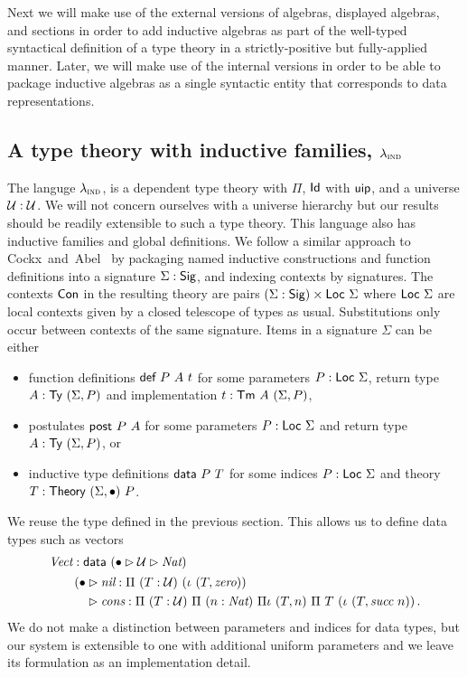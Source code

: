 Next we will make use of the external versions of algebras, displayed algebras,
and sections in order to add inductive algebras as part of the well-typed
syntactical definition of a type theory in a strictly-positive but fully-applied
manner. Later, we will make use of the internal versions in order to be able to
package inductive algebras as a single syntactic entity that corresponds to data
representations.

\subsection{A type theory with inductive families, $\lambda_{\textsc{ind}}$}\label{sub:lambdaind}

The languge $\lambda_{\textsc{ind}}$, is a dependent type theory with $\Pi$, $\textsf{Id}$ with
$\textsf{uip}$, and a universe $\mathcal{U} : \mathcal{U}$. We will not concern ourselves with a
universe hierarchy but our results should be readily extensible to such a type
theory. This language also has inductive families and global definitions. We
follow a similar approach
to Cockx~and~Abel~\cite{Cockx2018-fk} by packaging named inductive constructions
and function definitions into a signature $\Sigma : \textsf{Sig}$, and indexing contexts
by signatures. The contexts $\textsf{Con}$ in the resulting theory are pairs $(\Sigma :
\textsf{Sig}) \times \textsf{Loc}\ \Sigma$ where $\Loc\ \Sigma$ are local contexts given by a
closed telescope of types as usual. Substitutions only occur between contexts of
the same signature. Items in a signature $\Sigma$ can be either

\begin{itemize}
	\item function definitions $\mta{def}\ P\ A\ t$ for some parameters $P : \textsf{Loc}\
		      \Sigma$, return type $A : \textsf{Ty}\ (\Sigma, P)$ and implementation $t : \textsf{Tm}\ A\ (\Sigma, P)$,
	\item postulates $\textsf{post}\ P\ A$ for some parameters $P : \textsf{Loc}\
		      \Sigma$ and return type $A : \textsf{Ty}\ (\Sigma, P)$, or
	\item inductive type definitions $\mta{data}\ P\ T$ for some indices $P :
		      \textsf{Loc}\ \Sigma$ and theory $T : \textsf{Theory}\ (\Sigma, \bullet)\ P$.
\end{itemize}

We reuse the  type defined in the previous section. This allows us
to define data types such as vectors
\begin{align*}
	 & \textit{Vect} : \textsf{data}\ (\bullet \rhd \mathcal{U} \rhd \textit{Nat})               \\
	 & \quad\begin{aligned}
		        \quad (\bullet & \rhd \textit{nil} : \Pi\ (T : \mathcal{U})\ (\iota\ (T, \textit{zero}))                                                          \\
		        \quad          & \rhd \textit{cons} : \Pi\ (T : \mathcal{U})\ \Pi\ (n : \textit{Nat})\ \Pi\iota\ (T, n)\ \Pi\ T\ (\iota\ (T, \textit{succ}\ n)) \,.
	        \end{aligned}
\end{align*}
We do not make a distinction between parameters and indices for data types, but
our system is extensible to one with additional uniform parameters and we leave its
formulation as an implementation detail.

